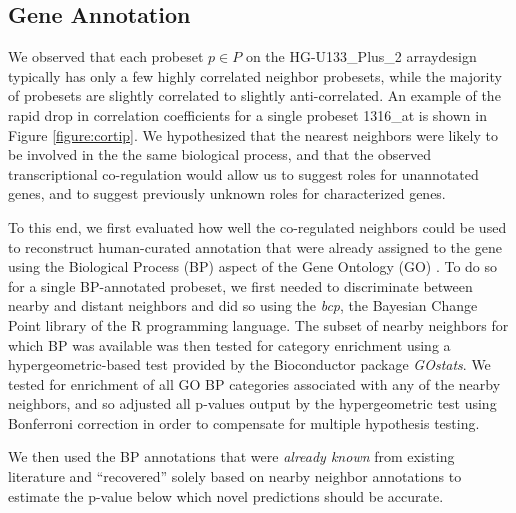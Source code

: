 \documentclass{bioinfo}
\begin{document}


\subsection{Gene Annotation}\label{Annotation Results}

We observed that each probeset $p \in P$ on the HG-U133\_Plus\_2 arraydesign
typically has only a few highly correlated neighbor probesets, while the
majority of probesets are slightly correlated to slightly anti-correlated.  An
example of the rapid drop in correlation coefficients for a single probeset
1316\_at is shown in Figure \ref{figure:cortip}.  We hypothesized that the
nearest neighbors were likely to be involved in the the same biological
process, and that the observed transcriptional co-regulation would allow us to
suggest roles for unannotated genes, and to suggest previously unknown roles
for characterized genes.

To this end, we first evaluated how well the co-regulated neighbors could be
used to reconstruct human-curated annotation that were already assigned to the
gene using the Biological Process (BP) aspect of the Gene Ontology (GO)
\cite{go}.  To do so for a single BP-annotated probeset, we first needed to
discriminate between nearby and distant neighbors and did so using the
\emph{bcp}, the Bayesian Change Point library of the R programming language.
The subset of nearby neighbors for which BP was available was then tested for
category enrichment using a hypergeometric-based test provided by the
Bioconductor \cite{bioconductor} package \emph{GOstats}.  We tested for
enrichment of all GO BP categories associated with any of the nearby neighbors,
and so adjusted all p-values output by the hypergeometric test using Bonferroni
correction in order to compensate for multiple hypothesis testing.

We then used the BP annotations that were \emph{already known} from existing
literature and ``recovered'' solely based on nearby neighbor annotations to
estimate the p-value below which novel predictions should be accurate.
\end{document}
